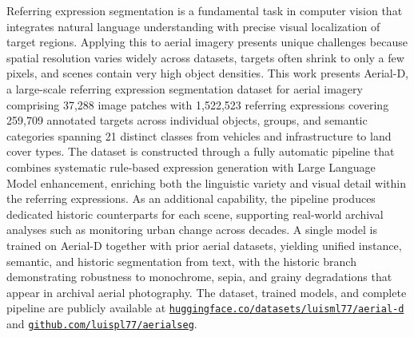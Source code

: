 \acresetall
\noindent Referring expression segmentation is a fundamental task in computer vision that integrates natural language understanding with precise visual localization of target regions. Applying this to aerial imagery presents unique challenges because spatial resolution varies widely across datasets, targets often shrink to only a few pixels, and scenes contain very high object densities. This work presents Aerial-D, a large-scale referring expression segmentation dataset for aerial imagery comprising 37,288 image patches with 1,522,523 referring expressions covering 259,709 annotated targets across individual objects, groups, and semantic categories spanning 21 distinct classes from vehicles and infrastructure to land cover types. The dataset is constructed through a fully automatic pipeline that combines systematic rule-based expression generation with Large Language Model enhancement, enriching both the linguistic variety and visual detail within the referring expressions. As an additional capability, the pipeline produces dedicated historic counterparts for each scene, supporting real-world archival analyses such as monitoring urban change across decades. A single model is trained on Aerial-D together with prior aerial datasets, yielding unified instance, semantic, and historic segmentation from text, with the historic branch demonstrating robustness to monochrome, sepia, and grainy degradations that appear in archival aerial photography. The dataset, trained models, and complete pipeline are publicly available at \href{https://huggingface.co/datasets/luisml77/aerial-d}{\texttt{huggingface.co/datasets/luisml77/aerial-d}} and \href{https://github.com/luispl77/aerialseg}{\texttt{github.com/luispl77/aerialseg}}.